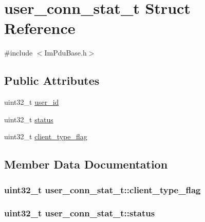 \hypertarget{structuser__conn__stat__t}{}\section{user\+\_\+conn\+\_\+stat\+\_\+t Struct Reference}
\label{structuser__conn__stat__t}


{\ttfamily \#include $<$Im\+Pdu\+Base.\+h$>$}

\subsection*{Public Attributes}
\begin{DoxyCompactItemize}
\item 
uint32\+\_\+t \hyperlink{structuser__conn__stat__t_a3be00a936749eae9b3ff83578109c902}{user\+\_\+id}
\item 
uint32\+\_\+t \hyperlink{structuser__conn__stat__t_a6aa050e28134e7cd0ae04223f7e8a303}{status}
\item 
uint32\+\_\+t \hyperlink{structuser__conn__stat__t_ab0ad112c3279ceb3f492a82eac3f5cf8}{client\+\_\+type\+\_\+flag}
\end{DoxyCompactItemize}


\subsection{Member Data Documentation}
\hypertarget{structuser__conn__stat__t_ab0ad112c3279ceb3f492a82eac3f5cf8}{}
\subsubsection[{client\+\_\+type\+\_\+flag}]{\setlength{\rightskip}{0pt plus 5cm}uint32\+\_\+t user\+\_\+conn\+\_\+stat\+\_\+t\+::client\+\_\+type\+\_\+flag}\label{structuser__conn__stat__t_ab0ad112c3279ceb3f492a82eac3f5cf8}
\hypertarget{structuser__conn__stat__t_a6aa050e28134e7cd0ae04223f7e8a303}{}
\subsubsection[{status}]{\setlength{\rightskip}{0pt plus 5cm}uint32\+\_\+t user\+\_\+conn\+\_\+stat\+\_\+t\+::status}\label{structuser__conn__stat__t_a6aa050e28134e7cd0ae04223f7e8a303}
\hypertarget{structuser__conn__stat__t_a3be00a936749eae9b3ff83578109c902}{}
